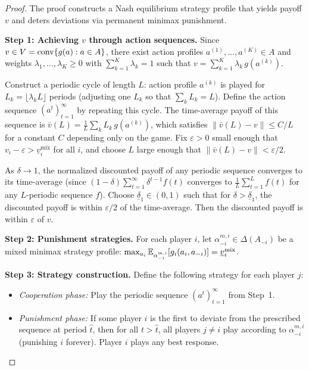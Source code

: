 \documentclass[11pt,a4paper]{article}
\begin{document}
\begin{proof}
The proof constructs a Nash equilibrium strategy profile that yields payoff
$v$ and deters deviations via permanent minimax punishment.

\textbf{Step 1: Achieving $v$ through action sequences.}
Since $v \in V = \operatorname{conv}\{g(a) : a \in A\}$, there exist action profiles
$a^{(1)}, \ldots, a^{(K)} \in A$ and weights
$\lambda_1, \ldots, \lambda_K \geq 0$ with $\sum_{k=1}^K \lambda_k = 1$
such that $v = \sum_{k=1}^K \lambda_k\, g(a^{(k)})$.

Construct a periodic cycle of length $L$: action profile $a^{(k)}$ is
played for $L_k = \lfloor \lambda_k L \rfloor$ periods (adjusting one
$L_k$ so that $\sum_k L_k = L$). Define the action sequence
$(a^t)_{t=1}^\infty$ by repeating this cycle. The time-average payoff of
this sequence is $\bar{v}(L) = \frac{1}{L}\sum_{k} L_k\, g(a^{(k)})$,
which satisfies $\|\bar{v}(L) - v\| \leq C/L$ for a constant $C$
depending only on the game. Fix $\varepsilon > 0$ small enough that
$v_i - \varepsilon > \underline{v}_i^{\mathrm{mix}}$ for all $i$, and
choose $L$ large enough that $\|\bar{v}(L) - v\| < \varepsilon/2$.

As $\delta \to 1$, the normalized discounted payoff of any periodic
sequence converges to its time-average (since
$(1-\delta)\sum_{t=1}^\infty \delta^{t-1} f(t)$ converges to
$\frac{1}{L}\sum_{t=1}^L f(t)$ for any $L$-periodic sequence $f$). Choose
$\underline{\delta}_1 \in (0,1)$ such that for $\delta >
\underline{\delta}_1$, the discounted payoff is within $\varepsilon/2$ of
the time-average. Then the discounted payoff is within $\varepsilon$ of $v$.

\textbf{Step 2: Punishment strategies.}
For each player $i$, let $\alpha_{-i}^{m,i} \in \Delta(A_{-i})$ be a
mixed minimax strategy profile:
$\max_{a_i} \mathbb{E}_{\alpha_{-i}^{m,i}}[g_i(a_i, a_{-i})]
= \underline{v}_i^{\mathrm{mix}}$.

\textbf{Step 3: Strategy construction.}
Define the following strategy for each player $j$:
\begin{itemize}
    \item \emph{Cooperation phase:} Play the periodic sequence
    $(a^t)_{t=1}^\infty$ from Step~1.
    \item \emph{Punishment phase:} If some player $i$ is the first to
    deviate from the prescribed sequence at period $\hat{t}$, then for all
    $t > \hat{t}$, all players $j \neq i$ play according to
    $\alpha_{-i}^{m,i}$ (punishing $i$ forever). Player $i$ plays any
    best response.
\end{itemize}


\end{proof}
\end{document}
